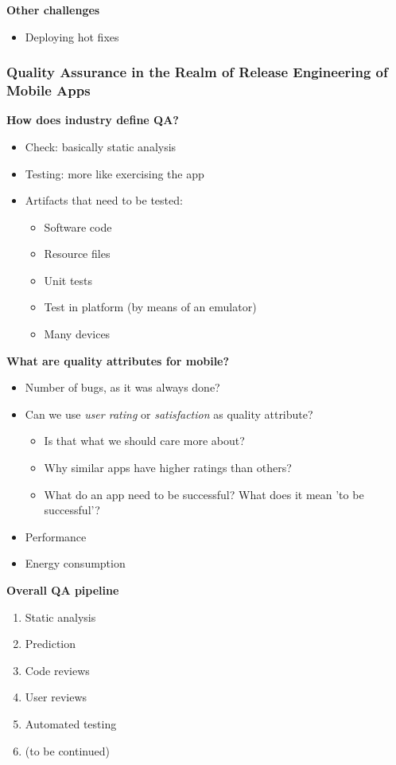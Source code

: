\documentclass[a4paper]{article}
\begin{document}
\textbf{Other challenges}
\begin{itemize}
\item Deploying hot fixes
\end{itemize}

\subsubsection{Quality Assurance in the Realm of Release Engineering of Mobile Apps}

\textbf{How does industry define QA?}

\begin{itemize}
\item Check: basically static analysis
\item Testing: more like exercising the app

\item Artifacts that need to be tested:
	\begin{itemize}
	\item Software code
	\item Resource files
	\item Unit tests
	\item Test in platform (by means of an emulator)
	\item Many devices
	\end{itemize}
\end{itemize}

\textbf{What are quality attributes for mobile?}

\begin{itemize}
\item Number of bugs, as it was always done?
\item Can we use \emph{user rating} or \emph{satisfaction} as quality attribute?
	\begin{itemize}
	\item Is that what we should care more about?
	\item Why similar apps have higher ratings than others?
	\item What do an app need to be successful? What does it mean 'to be successful'?
	\end{itemize}
\item Performance
\item Energy consumption
\end{itemize}

\textbf{Overall QA pipeline}

\begin{enumerate}
\item Static analysis
\item Prediction
\item Code reviews
\item User reviews
\item Automated testing
\item (to be continued)
\end{enumerate}
\end{document}
